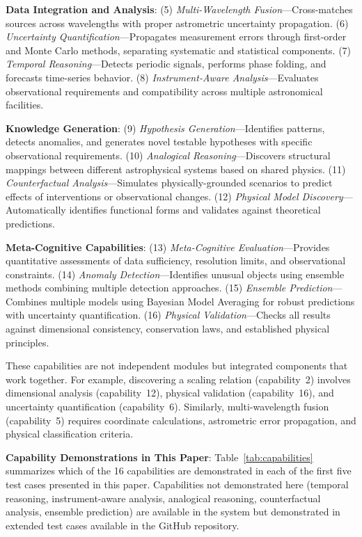 \documentclass[usenatbib]{rasti}
\begin{document}
\textbf{Data Integration and Analysis}: (5) \textit{Multi-Wavelength Fusion}---Cross-matches sources across wavelengths with proper astrometric uncertainty propagation. (6) \textit{Uncertainty Quantification}---Propagates measurement errors through first-order and Monte Carlo methods, separating systematic and statistical components. (7) \textit{Temporal Reasoning}---Detects periodic signals, performs phase folding, and forecasts time-series behavior. (8) \textit{Instrument-Aware Analysis}---Evaluates observational requirements and compatibility across multiple astronomical facilities.

\textbf{Knowledge Generation}: (9) \textit{Hypothesis Generation}---Identifies patterns, detects anomalies, and generates novel testable hypotheses with specific observational requirements. (10) \textit{Analogical Reasoning}---Discovers structural mappings between different astrophysical systems based on shared physics. (11) \textit{Counterfactual Analysis}---Simulates physically-grounded scenarios to predict effects of interventions or observational changes. (12) \textit{Physical Model Discovery}---Automatically identifies functional forms and validates against theoretical predictions.

\textbf{Meta-Cognitive Capabilities}: (13) \textit{Meta-Cognitive Evaluation}---Provides quantitative assessments of data sufficiency, resolution limits, and observational constraints. (14) \textit{Anomaly Detection}---Identifies unusual objects using ensemble methods combining multiple detection approaches. (15) \textit{Ensemble Prediction}---Combines multiple models using Bayesian Model Averaging for robust predictions with uncertainty quantification. (16) \textit{Physical Validation}---Checks all results against dimensional consistency, conservation laws, and established physical principles.

These capabilities are not independent modules but integrated components that work together. For example, discovering a scaling relation (capability~2) involves dimensional analysis (capability~12), physical validation (capability~16), and uncertainty quantification (capability~6). Similarly, multi-wavelength fusion (capability~5) requires coordinate calculations, astrometric error propagation, and physical classification criteria.

\textbf{Capability Demonstrations in This Paper}: Table~\ref{tab:capabilities} summarizes which of the 16 capabilities are demonstrated in each of the first five test cases presented in this paper. Capabilities not demonstrated here (temporal reasoning, instrument-aware analysis, analogical reasoning, counterfactual analysis, ensemble prediction) are available in the system but demonstrated in extended test cases available in the GitHub repository.
\end{document}
